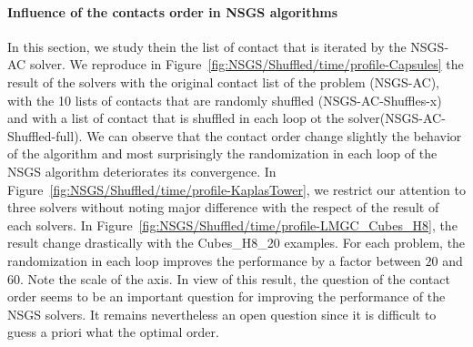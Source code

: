 \paragraph{Influence of the contacts order  in NSGS algorithms}

In this section, we study thein the list of contact that is iterated by the NSGS-AC solver. We reproduce in Figure~\ref{fig:NSGS/Shuffled/time/profile-Capsules} the result of the solvers with the original contact list of the problem (NSGS-AC), with the 10 lists of contacts that are randomly shuffled (NSGS-AC-Shuffles-x) and with a list of contact that is shuffled in each loop ot the solver(NSGS-AC-Shuffled-full). We can observe that the contact order change slightly the behavior of the algorithm and most surprisingly the randomization in each loop of the NSGS algorithm deteriorates its convergence. In Figure~\ref{fig:NSGS/Shuffled/time/profile-KaplasTower}, we restrict our attention to three solvers without noting major difference with the respect of the result of each solvers. In Figure~\ref{fig:NSGS/Shuffled/time/profile-LMGC_Cubes_H8}, the result change drastically with the Cubes\_H8\_20 examples. For each problem, the randomization  in each loop improves the performance by a factor between $20$ and $60$. Note the scale of the axis. In view of this result, the question of the contact order seems to be an important question for improving the performance of the NSGS solvers. It remains nevertheless an open question since it is difficult to guess a priori what the optimal order.


